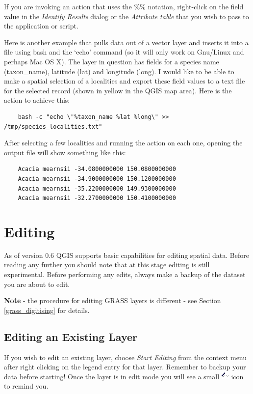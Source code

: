 If you are invoking an action that uses the \%\% notation, right-click on the
field value in the \textit{Identify Results} dialog or the
\textit{Attribute table} that you wish to pass to the application or script.

Here is another example that pulls data out of a vector layer and inserts it
into a file using bash and the `echo' command (so it will only work on Gnu/Linux
and perhaps Mac OS X). The layer in question has fields for a species name
(taxon\_name), latitude (lat) and longitude (long). I would like to be able to
make a spatial selection of a localities and export these field values to a text
file for the selected record (shown in yellow in the QGIS map area). Here is the
action to achieve this:

\begin{verbatim}
	bash -c "echo \"%taxon_name %lat %long\" >> /tmp/species_localities.txt"
\end{verbatim} 

After selecting a few localities and running the action on each one, opening the output file will show something like this:

\begin{verbatim}
	Acacia mearnsii -34.0800000000 150.0800000000
	Acacia mearnsii -34.9000000000 150.1200000000
	Acacia mearnsii -35.2200000000 149.9300000000
	Acacia mearnsii -32.2700000000 150.4100000000
\end{verbatim} 


\section{Editing}

As of version 0.6 QGIS supports basic capabilities for editing spatial data.
Before reading any further you should note that at this stage editing is still
experimental. Before performing any edits, always make a backup of the dataset
you are about to edit. 

\textbf{Note} - the procedure for editing GRASS layers is different - see
Section \ref{grass_digitising} for details.

\subsection{Editing an Existing Layer}
\label{sec:edit_existing_layer}
If you wish to edit an existing layer, choose \textit{Start Editing} from the
context menu after right clicking on the legend entry for that layer. Remember
to backup your data before starting! Once the layer is in edit mode you will
see a small \includegraphics[scale=1]{qgis_user_guide_images/editable} icon to
remind you.

